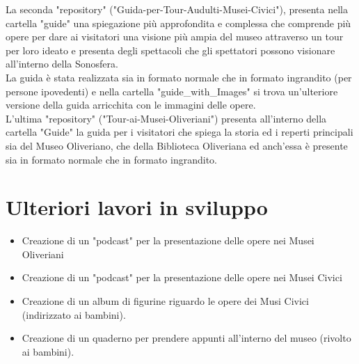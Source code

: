 \documentclass[hidelinks,12pt,a4paper]{article}
\begin{document}
\begin{flushleft}
		\bigskip
		La seconda "repository" ("Guida-per-Tour-Audulti-Musei-Civici"), presenta nella cartella "guide" una spiegazione più approfondita e complessa che comprende più opere per dare ai visitatori una visione più ampia del museo attraverso un tour per loro ideato e presenta degli spettacoli che gli spettatori possono visionare all'interno della Sonosfera.\\
		La guida è stata realizzata sia in formato normale che in formato ingrandito (per persone ipovedenti) e nella cartella "guide\_with\_Images" si trova un'ulteriore versione della guida arricchita con le immagini delle opere.\\
		L'ultima "repository" ("Tour-ai-Musei-Oliveriani") presenta all'interno della cartella "Guide" la guida per i visitatori che spiega la storia ed i reperti principali sia del Museo Oliveriano, che della Biblioteca Oliveriana ed anch'essa è presente sia in formato normale che in formato ingrandito.
		
		\section{Ulteriori lavori in sviluppo}
		
		\begin{itemize}
			\item Creazione di un "podcast" per la presentazione delle opere nei Musei Oliveriani
			\item Creazione di un "podcast" per la presentazione delle opere nei Musei Civici
			\item Creazione di un album di figurine riguardo le opere dei Musi Civici (indirizzato ai bambini).
			\item Creazione di un quaderno per prendere appunti all'interno del museo (rivolto ai bambini).
		\end{itemize}
		
		\vspace*{\fill}
		\doclicenseThis
		
	\end{flushleft}
\end{document}
